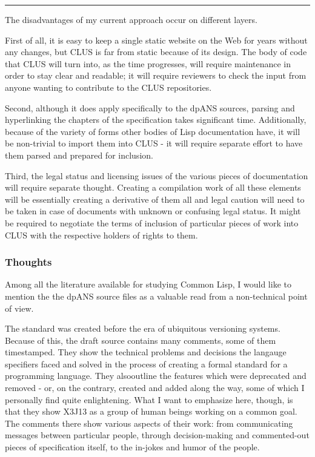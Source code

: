 \begin{center}\rule{0.5\linewidth}{\linethickness}\end{center}

The disadvantages of my current approach occur on different layers.

First of all, it is easy to keep a single static website on the Web for
years without any changes, but CLUS is far from static because of its
design. The body of code that CLUS will turn into, as the time
progresses, will require maintenance in order to stay clear and
readable; it will require reviewers to check the input from anyone
wanting to contribute to the CLUS repositories.

Second, although it does apply specifically to the dpANS sources,
parsing and hyperlinking the chapters of the specification takes
significant time. Additionally, because of the variety of forms other
bodies of Lisp documentation have, it will be non-trivial to import them
into CLUS - it will require separate effort to have them parsed and
prepared for inclusion.

Third, the legal status and licensing issues of the various pieces of
documentation will require separate thought. Creating a compilation work
of all these elements will be essentially creating a derivative of them
all and legal caution will need to be taken in case of documents with
unknown or confusing legal status. It might be required to negotiate the
terms of inclusion of particular pieces of work into CLUS with the
respective holders of rights to them.

\subsubsection{Thoughts}\label{thoughts}

Among all the literature available for studying Common Lisp, I would
like to mention the the dpANS source files as a valuable read from a
non-technical point of view.

The standard was created before the era of ubiquitous versioning
systems. Because of this, the draft source contains many comments, some
of them timestamped. They show the technical problems and decisions the
langauge specifiers faced and solved in the process of creating a formal
standard for a programming language. They alsooutline the features which
were deprecated and removed - or, on the contrary, created and added
along the way, some of which I personally find quite enlightening. What
I want to emphasize here, though, is that they show X3J13 as a group of
human beings working on a common goal. The comments there show various
aspects of their work: from communicating messages between particular
people, through decision-making and commented-out pieces of
specification itself, to the in-jokes and humor of the people.

